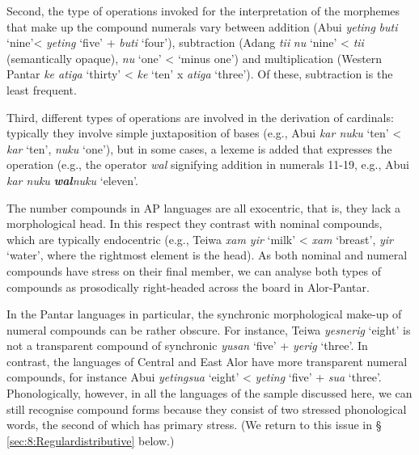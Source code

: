 Second, the type of operations invoked for the interpretation of the morphemes that make up the compound numerals vary between addition (Abui \textit{yeting} \textit{buti} `nine'{\textless} \textit{yeting} `five' + \textit{buti} `four'), subtraction (Adang  \textit{ti}\textit{{\textglotstop}}\textit{i} \textit{nu} `nine' {\textless} \textit{ti}\textit{{\textglotstop}}\textit{i} (semantically opaque), \textit{nu} `one' {\textless} `minus one') and multiplication (Western Pantar \textit{ke atiga} `thirty' {\textless} \textit{ke} `ten' x \textit{atiga} `three'). Of these, subtraction is the least frequent.

Third, different types of operations are involved in the derivation of cardinals: typically they involve simple juxtaposition of bases (e.g., Abui \textit{kar nuku} `ten' {\textless} \textit{kar} `ten', \textit{nuku} `one'), but in some cases, a lexeme is added that expresses the operation (e.g., the operator \textit{wal} signifying addition in numerals 11-19, e.g., Abui \textit{kar nuku} \textbf{\textit{wal}}\textit{nuku} `eleven'. 

The number compounds in AP languages are all exocentric, that is, they lack a morphological head. In this respect they contrast with nominal compounds, which are typically endocentric (e.g., Teiwa \textit{xam yir} `milk' {\textless} \textit{xam} `breast', \textit{yir} `water', where the rightmost element is the head). As both nominal and numeral compounds have stress on their final member, we can analyse both types of compounds as prosodically right-headed across the board in Alor-Pantar. 

In the Pantar languages in particular, the synchronic morphological make-up of numeral compounds can be rather obscure. For instance, Teiwa \textit{yesnerig} `eight' is not a transparent compound of synchronic \textit{yusan} `five' + \textit{yerig} `three'. In contrast, the languages of Central and East Alor have more transparent numeral compounds, for instance Abui \textit{yetingsua} `eight' {\textless} \textit{yeting} `five' + \textit{sua} `three'. Phonologically, however, in all the languages of the sample discussed here, we can still recognise compound forms because they consist of two stressed phonological words, the second of which has primary stress. (We return to this issue in {\S} \ref{sec:8:Regulardistributive} below.) 

